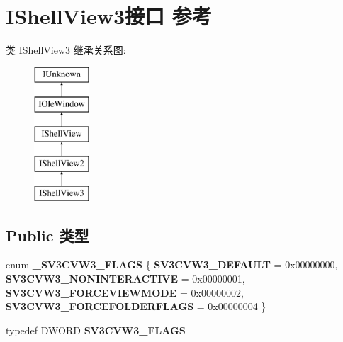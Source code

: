 \hypertarget{interface_i_shell_view3}{}\section{I\+Shell\+View3接口 参考}
\label{interface_i_shell_view3}
类 I\+Shell\+View3 继承关系图\+:\begin{figure}[H]
\begin{center}
\leavevmode
\includegraphics[height=5.000000cm]{interface_i_shell_view3}
\end{center}
\end{figure}
\subsection*{Public 类型}
\begin{DoxyCompactItemize}
\item 
\mbox{\label{interface_i_shell_view3_a4d161ffd6edbd6550ae0ef586f9e0a4f}} 
enum {\bfseries \+\_\+\+S\+V3\+C\+V\+W3\+\_\+\+F\+L\+A\+GS} \{ {\bfseries S\+V3\+C\+V\+W3\+\_\+\+D\+E\+F\+A\+U\+LT} = 0x00000000, 
{\bfseries S\+V3\+C\+V\+W3\+\_\+\+N\+O\+N\+I\+N\+T\+E\+R\+A\+C\+T\+I\+VE} = 0x00000001, 
{\bfseries S\+V3\+C\+V\+W3\+\_\+\+F\+O\+R\+C\+E\+V\+I\+E\+W\+M\+O\+DE} = 0x00000002, 
{\bfseries S\+V3\+C\+V\+W3\+\_\+\+F\+O\+R\+C\+E\+F\+O\+L\+D\+E\+R\+F\+L\+A\+GS} = 0x00000004
 \}
\item 
\mbox{\label{interface_i_shell_view3_afdeb3565b44f491e211df238f2606539}} 
typedef D\+W\+O\+RD {\bfseries S\+V3\+C\+V\+W3\+\_\+\+F\+L\+A\+GS}
\end{DoxyCompactItemize}
